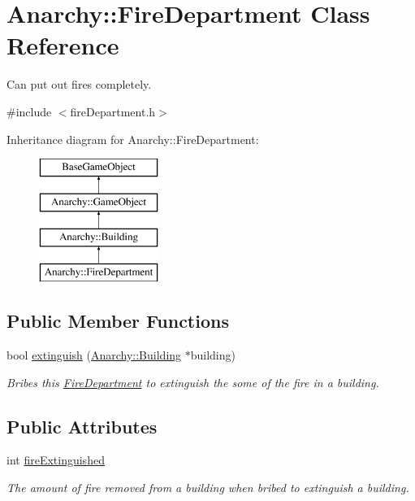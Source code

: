 \hypertarget{classAnarchy_1_1FireDepartment}{\section{Anarchy\-:\-:Fire\-Department Class Reference}
\label{classAnarchy_1_1FireDepartment}
}


Can put out fires completely.  




{\ttfamily \#include $<$fire\-Department.\-h$>$}

Inheritance diagram for Anarchy\-:\-:Fire\-Department\-:\begin{figure}[H]
\begin{center}
\leavevmode
\includegraphics[height=4.000000cm]{classAnarchy_1_1FireDepartment}
\end{center}
\end{figure}
\subsection*{Public Member Functions}
\begin{DoxyCompactItemize}
\item 
bool \hyperlink{classAnarchy_1_1FireDepartment_a0d01ce6fc38d520fa6e6ff4f6b2f134b}{extinguish} (\hyperlink{classAnarchy_1_1Building}{Anarchy\-::\-Building} $\ast$building)
\begin{DoxyCompactList}\small\item\em Bribes this \hyperlink{classAnarchy_1_1FireDepartment}{Fire\-Department} to extinguish the some of the fire in a building. \end{DoxyCompactList}\end{DoxyCompactItemize}
\subsection*{Public Attributes}
\begin{DoxyCompactItemize}
\item 
int \hyperlink{classAnarchy_1_1FireDepartment_a859e81aeb1067f5218d9e894d98bceec}{fire\-Extinguished}
\begin{DoxyCompactList}\small\item\em The amount of fire removed from a building when bribed to extinguish a building. \end{DoxyCompactList}\end{DoxyCompactItemize}
